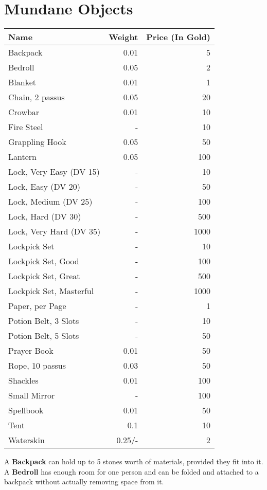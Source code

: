\section{Mundane Objects}
\begin{longtable}{l | r | r}
	Name & Weight & Price (In Gold)\\ \hline
	Backpack & 0.01 & 5\\
	Bedroll & 0.05 & 2\\
	Blanket & 0.01 & 1\\
	Chain, 2 passus & 0.05 & 20\\
	Crowbar & 0.01 & 10\\
	Fire Steel & - & 10\\
	Grappling Hook & 0.05 & 50\\
	Lantern & 0.05 & 100\\
	Lock, Very Easy (DV 15) & - & 10\\
	Lock, Easy (DV 20) & - & 50\\
	Lock, Medium (DV 25) & - & 100\\
	Lock, Hard (DV 30) & - & 500\\
	Lock, Very Hard (DV 35) & - & 1000\\
	Lockpick Set & - & 10\\
	Lockpick Set, Good & - & 100\\
	Lockpick Set, Great & - & 500\\
	Lockpick Set, Masterful & - & 1000\\
	Paper, per Page & - & 1\\
	Potion Belt, 3 Slots & - & 10\\
	Potion Belt, 5 Slots & - & 50\\
	Prayer Book & 0.01 & 50\\
	Rope, 10 passus & 0.03 & 50\\
	Shackles & 0.01 & 100\\
	Small Mirror & - & 100\\
	Spellbook & 0.01 & 50\\
	Tent & 0.1 & 10\\
	Waterskin & 0.25/- & 2\\
\end{longtable}



A \textbf{Backpack} can hold up to 5 stones worth of materials, provided they fit into it.\\

A \textbf{Bedroll} has enough room for one person and can be folded and attached to a backpack without actually removing space from it.\\

